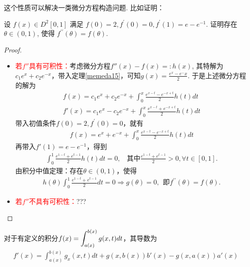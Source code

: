 \begin{note}
    这个性质可以解决一类微分方程构造问题. 比如证明：
\end{note}

\begin{exercise}
设 $f(x) \in D^2[0,1]$ 满足 $f(0)=2, f^{\prime}(0)=0, f^{\prime}(1)=e-e^{-1}$. 证明存在 $\theta \in(0,1)$, 使得 $f^{\prime \prime}(\theta)=f(\theta)$.
\end{exercise}

\begin{proof}
    \begin{itemize}
        \item \textcolor{red}{若$f''$具有可积性：}考虑微分方程$f''(x)-f(x)=:h(x)$, 其特解为$c_1e^{x}+c_2e^{-x}$，带入定理\cref{memeda15}，可知$g(x)=\displaystyle \frac{e^x-e^-x}{2}$. 于是上述微分方程的解为
              \begin{align*}
                  f(x)=c_1e^{x}+c_2e^{-x}+\int_{0}^{x}\frac{e^{x-t}-e^{-x+t}}{2}h(t)dt \\
                  f'(x)=c_1e^{x}-c_2e^{-x}+\int_{0}^{x}\frac{e^{x-t}+e^{-x+t}}{2}h(t)dt
              \end{align*}
              带入初值条件$f(0)=2, f^{\prime}(0)=0$，就有
              \begin{align}\label{memeda16}
                  f(x)=e^{x}+e^{-x}+\int_{0}^{x}\frac{e^{x-t}-e^{-x+t}}{2}h(t)dt
              \end{align}
              再带入$f'(1)=e-e^{-1}$，得到
              \begin{align*}
                  \int_{0}^{1}\frac{e^{1-t}+e^{t-1}}{2}h(t)dt=0,\ \ \ \ \text{其中}\frac{e^{1-t}+e^{t-1}}{2}>0,\forall t\in[0,1].
              \end{align*}
              由积分中值定理：存在$\theta\in (0,1)$，使得
              \begin{align*}
                  h(\theta )\int_{0}^{1}\frac{e^{1-t}+e^{t-1}}{2}dt=0\Rightarrow g(\theta)=0,\ \ \text{即}f^{\prime \prime}(\theta)=f(\theta).
              \end{align*}
        \item \textcolor{red}{若$f''$不具有可积性：}???
    \end{itemize}
\end{proof}

\begin{theorem}[含参积分求导公式]\label{含参积分求导公式}
    对于有定义的积分$\displaystyle f(x)=\int_{a(x)}^{b(x)}g(x,t)dt \displaystyle$，其导数为
    \begin{align}
        f'(x)=\int_{a(x)}^{b(x)}g_x(x,t)dt+g(x,b(x))b'(x)-g(x,a(x))a'(x)
    \end{align}
\end{theorem}

